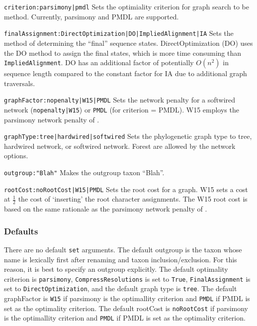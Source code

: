 \documentclass[11pt]{article}
\begin{document}
			\smallskip
			\noindent \texttt{criterion:parsimony|pmdl} Sets the optimiality criterion for graph search to be method.  Currently, parsimony and PMDL \citep{WheelerandVaron2022} are supported.
			
			\smallskip
			\noindent \texttt{finalAssignment:DirectOptimization|DO|ImpliedAlignment|IA} Sets the method of determining the ``final''
			sequence states. DirectOptimization (DO) uses the DO method to assign the final states, which is more time consuming 
			than \texttt{ImpliedAlignment}. DO has an additional factor of potentially $O(n^2)$ in sequence length compared to the constant factor for IA due to additional graph traversals.
			
			\smallskip
			\noindent \texttt{graphFactor:nopenalty|W15|PMDL} Sets the network penalty  for a softwired network (\texttt{nopenalty|W15}) or \texttt{PMDL} (for criterion = PMDL).  W15 employs the
			parsimony network penalty of \cite{Wheeler2015}.
			
			\smallskip
			\noindent \texttt{graphType:tree|hardwired|softwired} Sets the phylogenetic graph type to tree, hardwired network, or softwired network.  Forest are allowed 
			by the network options.
			
			\smallskip
			\noindent \texttt{outgroup:"Blah"} Makes the outgroup taxon ``Blah''. 
			
			\smallskip
			\noindent \texttt{rootCost:noRootCost|W15|PMDL} Sets the root cost for a graph.  W15 sets a cost at $\frac{1}{2}$ the cost of `inserting' the root character assignments. 
			The W15 root cost is based on the same rationale as the parsimony network penalty of \cite{Wheeler2015}.
			
		\subsubsection{Defaults} 
		There are no default \texttt{set} arguments.  The default outgroup is the taxon whose name  is lexically first after
		renaming and taxon inclusion/exclusion. For this reason, it is best to specify an outgroup explicitly.
		The default optimality criterion is \texttt{parsimony}, \texttt{CompressResolutions} is set to \texttt{True}, \texttt{FinalAssignment} is set to \texttt{DirectOptimization}, and the default graph type is \texttt{tree}.  The default graphFactor is \texttt{W15} if parsimony is the optimallity criterion and \texttt{PMDL} if PMDL is set as the optimality criterion.  The default rootCost
		is \texttt{noRootCost} if  parsimony is the optimallity criterion and \texttt{PMDL} if PMDL is set as the optimality criterion.
		
\end{document}
